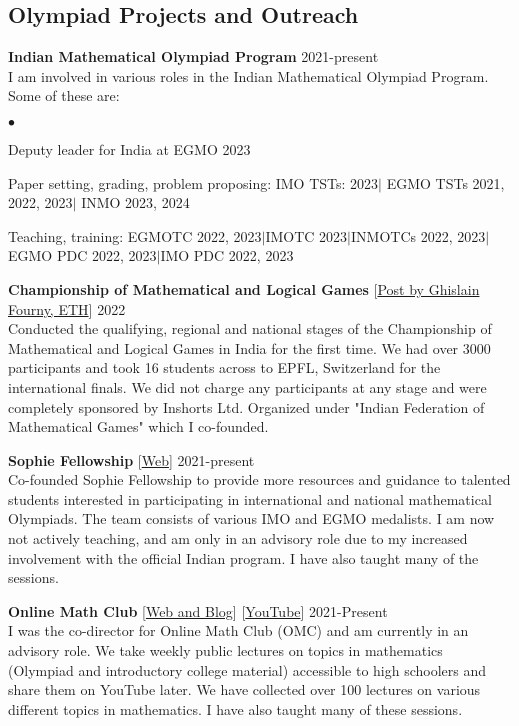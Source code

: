 \documentclass[margin,line, 10pt]{res}
\newenvironment{list2}{
  \begin{list}{$\bullet$}{%
      \setlength{\itemsep}{0in}
      \setlength{\parsep}{0in} \setlength{\parskip}{0in}
      \setlength{\topsep}{0in} \setlength{\partopsep}{0in} 
      \setlength{\leftmargin}{0.2in}}}{\end{list}}
\begin{document}
\begin{resume}
\section{\sc Olympiad Projects and Outreach}
{\bf Indian Mathematical Olympiad Program} \hfill 2021-present\\
I am involved in various roles in the Indian Mathematical Olympiad Program. Some of these are:
\begin{list2}
    \item Deputy leader for India at EGMO 2023
    \item Paper setting, grading, problem proposing: IMO TSTs: 2023$\mid$ EGMO TSTs 2021, 2022, 2023$\mid$  INMO 2023, 2024
    \item Teaching, training: EGMOTC 2022, 2023$\mid$IMOTC 2023$\mid$INMOTCs 2022, 2023$\mid$EGMO PDC 2022, 2023$\mid$IMO PDC 2022, 2023
\end{list2}

{\bf Championship of Mathematical and Logical Games} {\hspace{1em} [\href{https://www.linkedin.com/posts/ghislainfourny_hamen-bahut-bahut-badhia-laga-ki-pahle-baar-activity-6969912358307536896--pLr?utm_source=share&utm_medium=member_desktop}{Post by Ghislain Fourny, ETH}]} \hfill 2022\\
Conducted the qualifying, regional and national stages of the Championship of Mathematical and Logical Games in India for the first time. We had over 3000 participants and took 16 students across to EPFL, Switzerland for the international finals. We did not charge any participants at any stage and were completely sponsored by Inshorts Ltd. Organized under "Indian Federation of Mathematical Games" which I co-founded. 

{\bf Sophie Fellowship}{\hspace{1em} [\href{https://www.sophiefellowship.in/}{Web}]}  \hfill 2021-present\\
Co-founded Sophie Fellowship to provide more resources and guidance to talented students interested in participating in international and national mathematical Olympiads. The team consists of various IMO and EGMO medalists. I am now not actively teaching, and am only in an advisory role due to my increased involvement with the official Indian program. I have also taught many of the sessions.

{\textbf {Online Math Club}}{ \hspace{1em} [\href{https://omath.club/}{Web and Blog}] \hspace{0.4em} [\href{https://www.youtube.com/@OMath/videos}{YouTube}]} \hfill 2021-Present\\
I was the co-director for Online Math Club (OMC) and am currently in an advisory role. We take weekly public lectures on topics in mathematics (Olympiad and introductory college material) accessible to high schoolers and share them on YouTube later. We have collected over 100 lectures on various different topics in mathematics.  I have also taught many of these sessions.


\end{resume}
\end{document}
